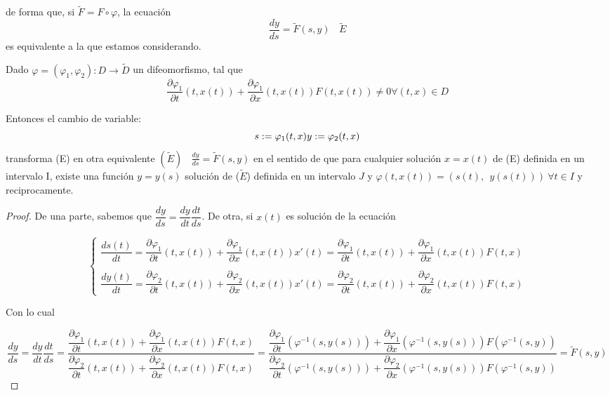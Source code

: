   de forma que, si $\tilde{F} = F \circ \varphi$, la ecuación
  \[ \dfrac{dy}{ds} = \tilde{F}(s, y) \ \ \ \ \tilde{E}\]
  es equivalente a la que estamos considerando.


\begin{nprop}

Dado $\varphi = (\varphi _1, \varphi _2) : D \to \tilde{D}$ un difeomorfismo, tal que 
\[
\dfrac{\partial \varphi_1}{\partial t}(t, x(t)) + \dfrac{\partial \varphi_1}{\partial x}(t, x(t)) F(t,x(t)) \neq 0 \forall (t,x) \in D
\]

Entonces el cambio de variable:
\[
s := \varphi _1(t,x)\\
y := \varphi _2 (t,x)
\]
transforma (E) en otra equivalente $(\tilde{E}) \ \ \ \ \frac{dy}{ds} = \tilde{F}(s,y)$ en el sentido de que para cualquier solución $x = x(t)$ de (E) definida en un intervalo I, existe una función $y=y(s)$ solución de ($\tilde{E}$) definida en un intervalo $J$ y $\varphi(t, x(t)) = (s(t), \ \ y(s(t))) \ \forall t \in I$ y reciprocamente.
\end{nprop}

\begin{proof}

  De una parte, sabemos que $\dfrac{dy}{ds} = \dfrac{dy}{dt}\dfrac{dt}{ds}$. De otra, si $x(t)$
  es solución de la ecuación

  
  \[
  \begin{cases}
    \dfrac{ds(t)}{dt} = \dfrac{\partial \varphi_1}{\partial t}(t, x(t)) + \dfrac{\partial \varphi_1}{\partial x}(t, x(t))x'(t) = \dfrac{\partial \varphi_1}{\partial t}(t, x(t)) + \dfrac{\partial \varphi_1}{\partial x}(t, x(t))F(t, x) \\ \\

 \dfrac{dy(t)}{dt} = \dfrac{\partial \varphi_2}{\partial t}(t, x(t)) + \dfrac{\partial \varphi_2}{\partial x}(t, x(t))x'(t) = \dfrac{\partial \varphi_2}{\partial t}(t, x(t)) + \dfrac{\partial \varphi_2}{\partial x}(t, x(t))F(t, x)
   
  \end{cases}
  \]

  Con lo cual

  \[
  \dfrac{dy}{ds} = \dfrac{dy}{dt}\dfrac{dt}{ds} = \dfrac{\dfrac{\partial \varphi_1}{\partial t}(t, x(t)) + \dfrac{\partial \varphi_1}{\partial x}(t, x(t))F(t, x)}{\dfrac{\partial \varphi_2}{\partial t}(t, x(t)) + \dfrac{\partial \varphi_2}{\partial x}(t, x(t))F(t, x)}
  = \dfrac{\dfrac{\partial \varphi_1}{\partial t}(\varphi^{-1}(s, y(s))) + \dfrac{\partial \varphi_1}{\partial x}(\varphi^{-1}(s, y(s)))F(\varphi^{-1}(s, y))}{\dfrac{\partial \varphi_2}{\partial t}(\varphi^{-1}(s, y(s))) + \dfrac{\partial \varphi_2}{\partial x}(\varphi^{-1}(s, y(s)))F(\varphi^{-1}(s, y))} = \tilde{F}(s,y)
  \]


\end{proof}

